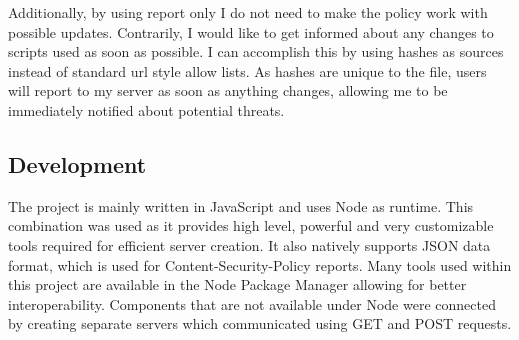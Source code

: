 Additionally, by using report only I do not need to make the policy work with possible updates.
Contrarily, I would like to get informed about any changes to scripts used as soon as possible.
I can accomplish this by using hashes as sources instead of standard url style allow lists.
As hashes are unique to the file, users will report to my server as soon as anything changes, allowing me to be immediately notified about potential threats.

\subsection{Development}

The project is mainly written in JavaScript and uses Node as runtime.
This combination was used as it provides high level, powerful and very customizable tools required for efficient server creation.
It also natively supports JSON data format, which is used for Content-Security-Policy reports.
Many tools used within this project are available in the Node Package Manager allowing for better interoperability.
Components that are not available under Node were connected by creating separate servers which communicated using GET and POST requests.

